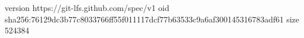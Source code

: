 version https://git-lfs.github.com/spec/v1
oid sha256:76129dc3b77c8033766ff55f011117dcf77b63533c9a6af300145316783adf61
size 524384
